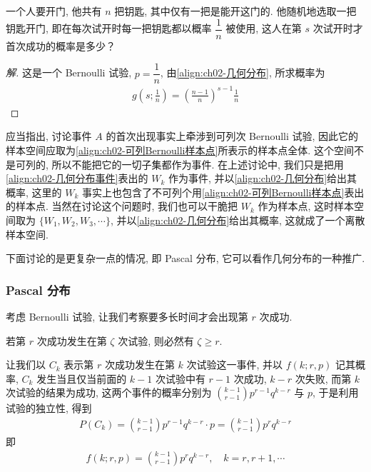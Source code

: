 \documentclass[../../main.tex]{subfiles}
\begin{document}
\begin{example}[试钥匙开门]\label{example:ch02-试钥匙开门}
一个人要开门, 他共有 $n$ 把钥匙, 其中仅有一把是能开这门的. 他随机地选取一把钥匙开门, 即在每次试开时每一把钥匙都以概率 $\dfrac{1}{n}$ 被使用, 这人在第 $s$ 次试开时才首次成功的概率是多少？

\begin{proof}[解]
这是一个 Bernoulli 试验, $p=\dfrac{1}{n}$, 由\eqref{align:ch02-几何分布}, 所求概率为
\begin{align*}
g\left(s;\frac{1}{n}\right)=\left(\frac{n-1}{n}\right)^{s-1}\frac{1}{n}
\end{align*}
\end{proof}

应当指出, 讨论事件 $A$ 的首次出现事实上牵涉到可列次 Bernoulli 试验, 因此它的样本空间应取为\eqref{align:ch02-可列Bernoulli样本点}所表示的样本点全体. 这个空间不是可列的, 所以不能把它的一切子集都作为事件. 在上述讨论中, 我们只是把用\eqref{align:ch02-几何分布事件}表出的 $W_k$ 作为事件, 并以\eqref{align:ch02-几何分布}给出其概率, 这里的 $W_k$ 事实上也包含了不可列个用\eqref{align:ch02-可列Bernoulli样本点}表出的样本点. 当然在讨论这个问题时, 我们也可以干脆把 $W_k$ 作为样本点, 这时样本空间取为 $\{W_1, W_2, W_3, \cdots\}$, 并以\eqref{align:ch02-几何分布}给出其概率, 这就成了一个离散样本空间.
\end{example}

下面讨论的是更复杂一点的情况, 即 Pascal 分布, 它可以看作几何分布的一种推广.

\subsubsection{Pascal 分布}

考虑 Bernoulli 试验, 让我们考察要多长时间才会出现第 $r$ 次成功.

若第 $r$ 次成功发生在第 $\zeta$ 次试验, 则必然有 $\zeta\geqslant r$.

让我们以 $C_k$ 表示第 $r$ 次成功发生在第 $k$ 次试验这一事件, 并以 $f(k;r,p)$ 记其概率, $C_k$ 发生当且仅当前面的 $k-1$ 次试验中有 $r-1$ 次成功, $k-r$ 次失败, 而第 $k$ 次试验的结果为成功, 这两个事件的概率分别为 $\binom{k-1}{r-1}p^{r-1}q^{k-r}$ 与 $p$, 于是利用试验的独立性, 得到
\begin{align*}
P(C_k)=\binom{k-1}{r-1}p^{r-1}q^{k-r}\cdot p=\binom{k-1}{r-1}p^r q^{k-r}
\end{align*}
即
\begin{align}\label{align:ch02-Pascal分布}
f(k;r,p)=\binom{k-1}{r-1}p^r q^{k-r},\quad k=r,r+1,\cdots
\end{align}
\end{document}
